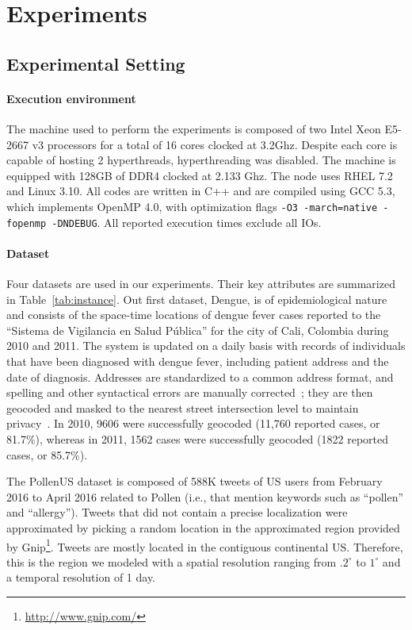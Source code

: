 \documentclass[10pt, conference, compsocconf]{IEEEtran}
\begin{document}
\section{Experiments}

\label{sec:experiments}

\subsection{Experimental Setting}

\paragraph{Execution environment} The machine used to perform the experiments is
composed of two Intel Xeon E5-2667 v3 processors for a total of
16 cores clocked at 3.2Ghz. Despite each core is capable of hosting 2
hyperthreads, hyperthreading was disabled. The machine is equipped with
128GB of DDR4 clocked at 2.133 Ghz. The node uses RHEL 7.2
and Linux 3.10. All codes are written in C++ and are compiled using GCC 5.3, which implements
OpenMP 4.0, with optimization flags \texttt{-O3 -march=native -fopenmp
  -DNDEBUG}. All reported execution times exclude all IOs.

\paragraph{Dataset} Four datasets are used in our experiments. Their
key attributes are summarized in Table~\ref{tab:instance}. 
Out first dataset, Dengue, is of epidemiological nature and consists of the space-time
locations of dengue fever cases reported to the “Sistema de Vigilancia
en Salud P\'{u}blica” for the city of Cali, Colombia during 2010 and 2011. The
system is updated on a daily basis with records of individuals that
have been diagnosed with dengue fever, including patient address and
the date of diagnosis. Addresses are standardized to a common address
format, and spelling and other syntactical errors are manually
corrected~\cite{delmelle2013spatio}; they are then geocoded and masked
to the nearest street intersection level to maintain
privacy~\cite{Kwan04}. In 2010, 9606 were successfully geocoded
(11,760 reported cases, or 81.7\%), whereas in 2011, 1562 cases were
successfully geocoded (1822 reported cases, or 85.7\%).

The PollenUS dataset is composed of 588K tweets of US users from
February 2016 to April 2016 related to Pollen (i.e., that mention
keywords such as ``pollen'' and ``allergy''). Tweets that did not
contain a precise localization were approximated by picking a random
location in the approximated region provided by
Gnip\footnote{\url{http://www.gnip.com/}}. Tweets are mostly located
in the contiguous continental US. Therefore, this is the region we
modeled with a spatial resolution ranging from $.2^\circ$ to $1^\circ$
and a temporal resolution of 1 day.
\end{document}

